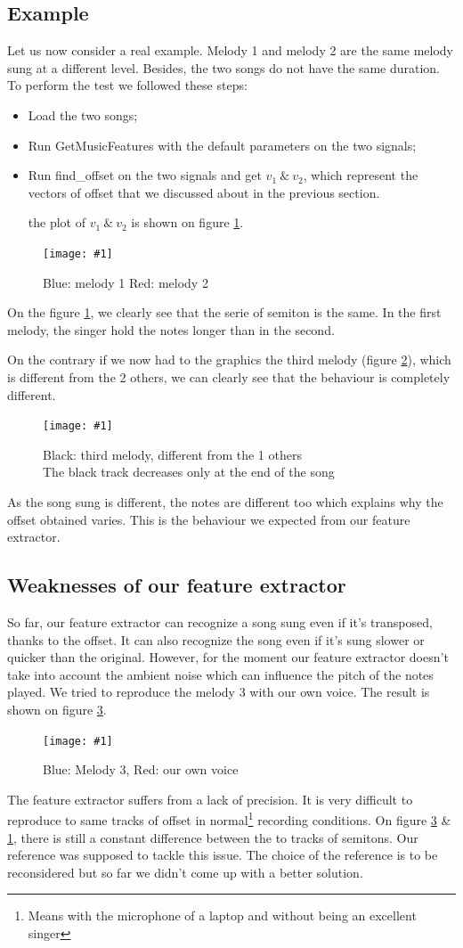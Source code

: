 \documentclass[a4paper]{report}
\newcommand{\img}[3]{\begin{figure}[!h] \centering \texttt{[image: \#1]}\captionsetup{justification=centering} \caption{#3} \label{#1} \end{figure}}
\begin{document}
\subsection{Example}
Let us now consider a real example. Melody 1 and melody 2 are the same melody sung at a different level. Besides, the two songs do not have the same duration.
To perform the test we followed these steps: \begin{itemize}
\item Load the two songs;
\item Run GetMusicFeatures with the default parameters on the two signals;
\item Run find\_offset on the two signals and get $v_{1}~\&~v_{2}$, which represent the vectors of offset that we discussed about in the previous section.

the plot of $v_{1}~\&~v_{2}$ is shown on figure \ref{test_extractor}.
\end{itemize}
\img{test_extractor}{.45}{ {\color{blue}Blue: melody 1} {\color{red}Red: melody 2}}
On the figure \ref{test_extractor}, we clearly see that the serie of semiton is the same. In the first melody, the singer hold the notes longer than in the second.


On the contrary if we now had to the graphics the third melody (figure \ref{Comparison_3_songs}), which is different from the 2 others, we can clearly see that the behaviour is completely different. 
\img{Comparison_3_songs}{0.5}{Black: third melody, different from the  1 others\\The black track decreases only at the end of the song}

As the song sung is different, the notes are different too which explains why the offset obtained varies. This is the behaviour we expected from our feature extractor.

\pagebreak
\subsection{Weaknesses of our feature extractor}

So far, our feature extractor can recognize a song sung even if it's transposed, thanks to the offset. It can also recognize the song even if it's sung slower or quicker than the original. However, for the moment our feature extractor doesn't take into account the ambient noise which can influence the pitch of the notes played.
We tried to reproduce the melody 3 with our own voice. The result is shown on figure \ref{melody3_experience}.

\img{melody3_experience}{.3}{{\color{blue}Blue: Melody 3}, {\color{red}Red: our own voice}}
The feature extractor suffers from a lack of precision. It is very difficult to reproduce to same tracks of offset in normal\footnote{Means with the microphone of a laptop and without being an excellent singer} recording conditions. On figure \ref{melody3_experience} \& \ref{test_extractor}, there is still a constant difference between the to tracks of semitons. Our reference was supposed to tackle this issue. The choice of the reference is to be reconsidered but so far we didn't come up with a better solution.
\end{document}
